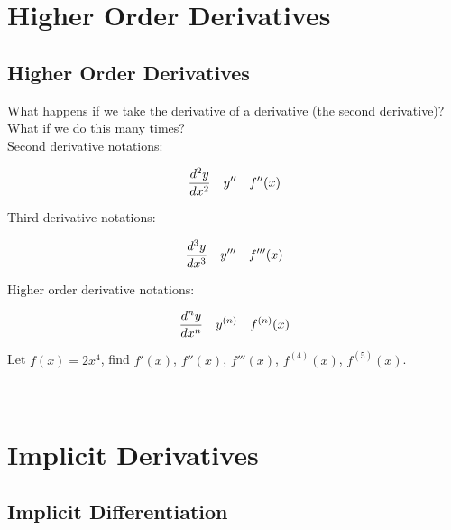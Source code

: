 \chapter{Higher Order Derivatives}

\section{Higher Order Derivatives}

What happens if we take the derivative of a derivative (the second derivative)? What if we do this many times? \\

Second derivative notations:

\begin{align}\nonumber
    {d^2y \over dx^2} &  & y'' &  & f''(x)
\end{align}

Third derivative notations:

\begin{align}\nonumber
    {d^3y \over dx^3} &  & y''' &  & f'''(x)
\end{align}

Higher order derivative notations:

\begin{align}\nonumber
    {d^ny \over dx^n} &  & y^{(n)} &  & f^{(n)}(x)
\end{align}

\begin{exercise}\nonumber
    Let $ f(x) = 2x^4 $, find $ f'(x) $, $ f''(x) $, $ f'''(x) $, $ f^{(4)}(x) $, $ f^{(5)}(x) $. \\

    \begin{align}
        \\
        \\
        \\
        \\
        \\
    \end{align}
\end{exercise}

\chapter{Implicit Derivatives}

\section{Implicit Differentiation}

